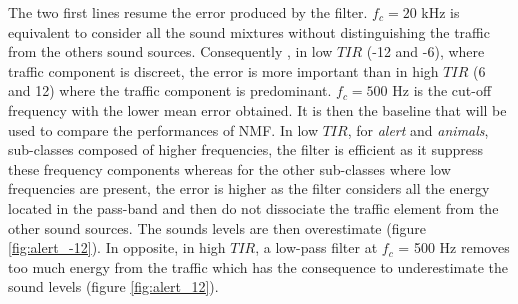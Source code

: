 \documentclass[twocolumn,a4paper,10pt]{article}
\begin{document}
The two first lines resume the error produced by the filter. $f_c = 20 $ kHz is equivalent to consider all the sound mixtures without distinguishing the traffic from the others sound sources. Consequently , in low $TIR$ (-12 and -6), where traffic component is discreet, the error is more important than in high $TIR$ (6 and 12) where the traffic component is predominant. $f_c = 500$ Hz is the cut-off frequency with the lower mean error obtained. It is then the baseline that will be used to compare the performances of NMF. In low $TIR$, for \textit{alert} and \textit{animals}, sub-classes composed of higher frequencies, the filter is efficient as it suppress these frequency components whereas for the other sub-classes where low frequencies are present, the error is higher as the filter considers all the energy located in the pass-band and then do not dissociate the traffic element from the other sound sources. The sounds levels are then overestimate (figure \ref{fig:alert_-12}). In opposite, in high $TIR$, a low-pass filter at $f_c$ = 500 Hz removes too much energy from the traffic which has the consequence to underestimate the sound levels (figure \ref{fig:alert_12}).\\
\end{document}
